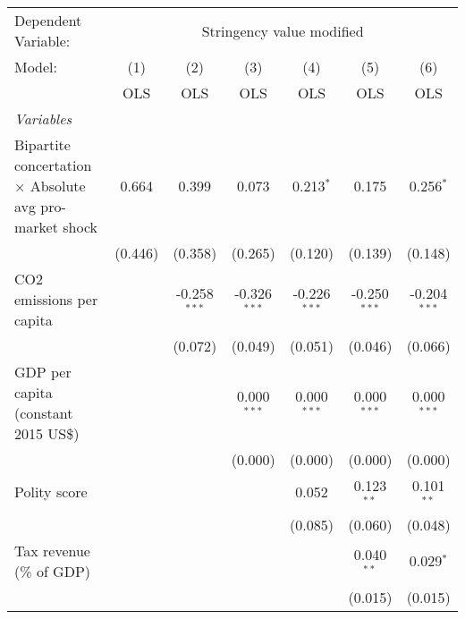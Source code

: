 
\begingroup
\centering
\begin{tabular}{lcccccc}
   \toprule
   Dependent Variable: & \multicolumn{6}{c}{Stringency value modified}\\
   Model:                                                         & (1)     & (2)            & (3)            & (4)            & (5)            & (6)\\  
                                                                  &  OLS    & OLS            & OLS            & OLS            & OLS            & OLS\\  
   \midrule
   \emph{Variables}\\
   Bipartite concertation $\times$ Absolute avg pro-market shock  & 0.664   & 0.399          & 0.073          & 0.213$^{*}$    & 0.175          & 0.256$^{*}$\\   
                                                                  & (0.446) & (0.358)        & (0.265)        & (0.120)        & (0.139)        & (0.148)\\   
   CO2 emissions per capita                                       &         & -0.258$^{***}$ & -0.326$^{***}$ & -0.226$^{***}$ & -0.250$^{***}$ & -0.204$^{***}$\\   
                                                                  &         & (0.072)        & (0.049)        & (0.051)        & (0.046)        & (0.066)\\   
   GDP per capita (constant 2015 US\$)                            &         &                & 0.000$^{***}$  & 0.000$^{***}$  & 0.000$^{***}$  & 0.000$^{***}$\\   
                                                                  &         &                & (0.000)        & (0.000)        & (0.000)        & (0.000)\\   
   Polity score                                                   &         &                &                & 0.052          & 0.123$^{**}$   & 0.101$^{**}$\\   
                                                                  &         &                &                & (0.085)        & (0.060)        & (0.048)\\   
   Tax revenue (\% of GDP)                                        &         &                &                &                & 0.040$^{**}$   & 0.029$^{*}$\\   
                                                                  &         &                &                &                & (0.015)        & (0.015)\\   

\end{tabular}
